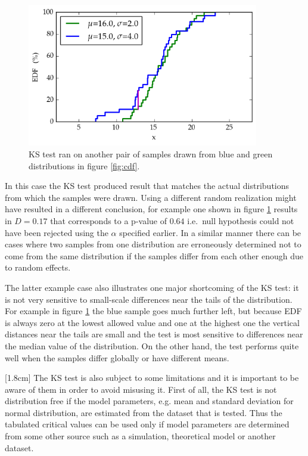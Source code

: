 \documentclass[english, oneside]{HYgradu}
\begin{document}
\begin{figure}
   \centering
   \includegraphics[width=0.9\textwidth]{kuvat/kstest-error.png}
   \caption{KS test ran on another pair of samples drawn from blue and green distributions in figure \ref{fig:cdf}.}
   \label{fig:ks-error} 
\end{figure}

In this case the KS test produced result that matches the actual distributions from which the samples were drawn. Using a different random realization might have resulted in a different conclusion, for example one shown in figure \ref{fig:ks-error} results in $D=0.17$ that corresponds to a p-value of $0.64$ i.e.\ null hypothesis could not have been rejected using the $\alpha$ specified earlier. In a similar manner there can be cases where two samples from one distribution are erroneously determined not to come from the same distribution if the samples differ from each other enough due to random effects.

The latter example case also illustrates one major shortcoming of the KS test: it is not very sensitive to small-scale differences near the tails of the distribution. For example in figure \ref{fig:ks-error} the blue sample goes much further left, but because EDF is always zero at the lowest allowed value and one at the highest one the vertical distances near the tails are small and the test is most sensitive to differences near the median value of the distribution. On the other hand, the test performs quite well when the samples differ globally or have different means. \citep{feigelson2012modern}

\reversemarginpar
{}[1.8cm]
The KS test is also subject to some limitations and it is important to be aware of them in order to avoid misusing it. First of all, the KS test is not distribution free if the model parameters, e.g. mean and standard deviation for normal distribution, are estimated from the dataset that is tested. Thus the tabulated critical values can be used only if model parameters are determined from some other source such as a simulation, theoretical model or another dataset.
\end{document}
